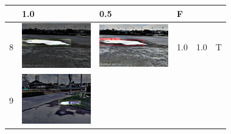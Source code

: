 \documentclass[10pt]{jarticle}
\begin{document}
\begin{table}[H]
\begin{tabular}{|l|l|l|l|l|l|}
\begin{minipage}{.1\textwidth}
           \end{minipage}       & 1.0 & 0.5 & F      \\ \hline
        8  & \begin{minipage}{.1\textwidth}
            \centering
            \includegraphics[width=0.9\linewidth]{./fig/2tab8_a.png}
           \end{minipage}       & \begin{minipage}{.1\textwidth}
            \centering
            \includegraphics[width=0.9\linewidth]{./fig/2tab8_r.png}
           \end{minipage}       & 1.0 & 1.0 & T       \\ \hline
        9  & \begin{minipage}{.1\textwidth}
            \centering
            \includegraphics[width=0.9\linewidth]{./fig/2tab9_a.png}

\end{minipage}
\end{tabular}
\end{table}
\end{document}
